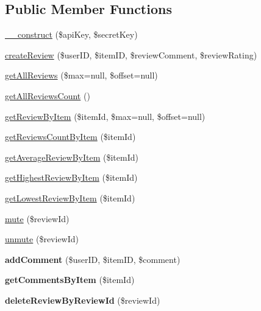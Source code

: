 \subsection*{Public Member Functions}
\begin{DoxyCompactItemize}
\item 
\hyperlink{class_review_service_a49f2ad222e06420736d750e167d55d7c}{\+\_\+\+\_\+construct} (\$api\+Key, \$secret\+Key)
\item 
\hyperlink{class_review_service_afe8adfe98c01bbffffe19f82b6430b9d}{create\+Review} (\$user\+I\+D, \$item\+I\+D, \$review\+Comment, \$review\+Rating)
\item 
\hyperlink{class_review_service_a629741ea35d9f7e5edce7f167e2f2f92}{get\+All\+Reviews} (\$max=null, \$offset=null)
\item 
\hyperlink{class_review_service_a7a22def7547cc00e59b802bd87fb8745}{get\+All\+Reviews\+Count} ()
\item 
\hyperlink{class_review_service_aa66cd40b01bdcc71f233439fb8e7976a}{get\+Review\+By\+Item} (\$item\+Id, \$max=null, \$offset=null)
\item 
\hyperlink{class_review_service_add1d96e047ca244b86efc202929316b0}{get\+Reviews\+Count\+By\+Item} (\$item\+Id)
\item 
\hyperlink{class_review_service_abd697ef9901321317caad17d1c874c94}{get\+Average\+Review\+By\+Item} (\$item\+Id)
\item 
\hyperlink{class_review_service_aa1b02e19f1c6c0b5d25a33a69e4abc20}{get\+Highest\+Review\+By\+Item} (\$item\+Id)
\item 
\hyperlink{class_review_service_a814f798afdac90ae2fa7222998a05dac}{get\+Lowest\+Review\+By\+Item} (\$item\+Id)
\item 
\hyperlink{class_review_service_a0f39e6daa155ac512ba9aa1c528e7060}{mute} (\$review\+Id)
\item 
\hyperlink{class_review_service_a0231ae832fc5f8a50c6ca13bb420ca3f}{unmute} (\$review\+Id)
\item 
\hypertarget{class_review_service_a3d8d54525a364ced59b22f26bbb89659}{{\bfseries add\+Comment} (\$user\+I\+D, \$item\+I\+D, \$comment)}\label{class_review_service_a3d8d54525a364ced59b22f26bbb89659}

\item 
\hypertarget{class_review_service_a7085fea0d706a2e73369f944acab18c9}{{\bfseries get\+Comments\+By\+Item} (\$item\+Id)}\label{class_review_service_a7085fea0d706a2e73369f944acab18c9}

\item 
\hypertarget{class_review_service_a7728d6f658f81a53ee4526586662094d}{{\bfseries delete\+Review\+By\+Review\+Id} (\$review\+Id)}\label{class_review_service_a7728d6f658f81a53ee4526586662094d}


\end{DoxyCompactItemize}
